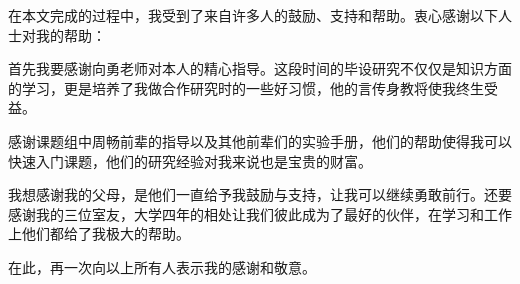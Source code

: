 
\begin{acknowledgements}
  在本文完成的过程中，我受到了来自许多人的鼓励、支持和帮助。衷心感谢以下人士对我的帮助：
  
  首先我要感谢向勇老师对本人的精心指导。这段时间的毕设研究不仅仅是知识方面的学习，更是培养了我做合作研究时的一些好习惯，他的言传身教将使我终生受益。
  
  感谢课题组中周畅前辈的指导以及其他前辈们的实验手册，他们的帮助使得我可以快速入门课题，他们的研究经验对我来说也是宝贵的财富。
  
  我想感谢我的父母，是他们一直给予我鼓励与支持，让我可以继续勇敢前行。还要感谢我的三位室友，大学四年的相处让我们彼此成为了最好的伙伴，在学习和工作上他们都给了我极大的帮助。

  在此，再一次向以上所有人表示我的感谢和敬意。
\end{acknowledgements}
